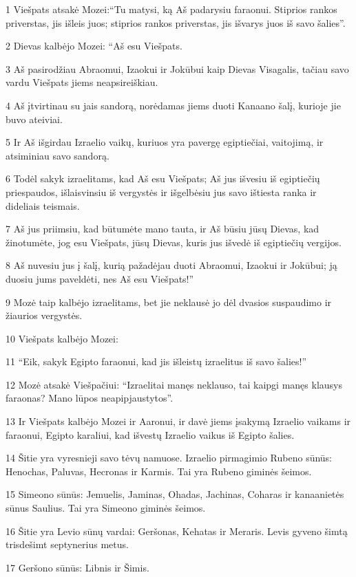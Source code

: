 \par 1 Viešpats atsakė Mozei:“Tu matysi, ką Aš padarysiu faraonui. Stiprios rankos priverstas, jis išleis juos; stiprios rankos priverstas, jis išvarys juos iš savo šalies”. 
\par 2 Dievas kalbėjo Mozei: “Aš esu Viešpats. 
\par 3 Aš pasirodžiau Abraomui, Izaokui ir Jokūbui kaip Dievas Visagalis, tačiau savo vardu Viešpats jiems neapsireiškiau. 
\par 4 Aš įtvirtinau su jais sandorą, norėdamas jiems duoti Kanaano šalį, kurioje jie buvo ateiviai. 
\par 5 Ir Aš išgirdau Izraelio vaikų, kuriuos yra pavergę egiptiečiai, vaitojimą, ir atsiminiau savo sandorą. 
\par 6 Todėl sakyk izraelitams, kad Aš esu Viešpats; Aš jus išvesiu iš egiptiečių priespaudos, išlaisvinsiu iš vergystės ir išgelbėsiu jus savo ištiesta ranka ir dideliais teismais. 
\par 7 Aš jus priimsiu, kad būtumėte mano tauta, ir Aš būsiu jūsų Dievas, kad žinotumėte, jog esu Viešpats, jūsų Dievas, kuris jus išvedė iš egiptiečių vergijos. 
\par 8 Aš nuvesiu jus į šalį, kurią pažadėjau duoti Abraomui, Izaokui ir Jokūbui; ją duosiu jums paveldėti, nes Aš esu Viešpats!” 
\par 9 Mozė taip kalbėjo izraelitams, bet jie neklausė jo dėl dvasios suspaudimo ir žiaurios vergystės. 
\par 10 Viešpats kalbėjo Mozei: 
\par 11 “Eik, sakyk Egipto faraonui, kad jis išleistų izraelitus iš savo šalies!” 
\par 12 Mozė atsakė Viešpačiui: “Izraelitai manęs neklauso, tai kaipgi manęs klausys faraonas? Mano lūpos neapipjaustytos”. 
\par 13 Ir Viešpats kalbėjo Mozei ir Aaronui, ir davė jiems įsakymą Izraelio vaikams ir faraonui, Egipto karaliui, kad išvestų Izraelio vaikus iš Egipto šalies. 
\par 14 Šitie yra vyresnieji savo tėvų namuose. Izraelio pirmagimio Rubeno sūnūs: Henochas, Paluvas, Hecronas ir Karmis. Tai yra Rubeno giminės šeimos. 
\par 15 Simeono sūnūs: Jemuelis, Jaminas, Ohadas, Jachinas, Coharas ir kanaanietės sūnus Saulius. Tai yra Simeono giminės šeimos. 
\par 16 Šitie yra Levio sūnų vardai: Geršonas, Kehatas ir Meraris. Levis gyveno šimtą trisdešimt septynerius metus. 
\par 17 Geršono sūnūs: Libnis ir Šimis. 

